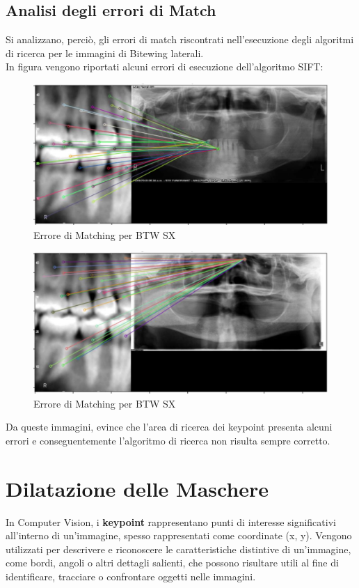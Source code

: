 \documentclass[12pt,a4paper,openright,twoside]{book}
\begin{document}
\subsection{Analisi degli errori di Match}
Si analizzano, perciò, gli errori di match riscontrati nell'esecuzione degli algoritmi di ricerca per le immagini di Bitewing laterali.\\
In figura vengono riportati alcuni errori di esecuzione dell'algoritmo SIFT:
\begin{figure}[H]
	\centering
	\includegraphics[width=13cm]{figures/matcherr.pdf}
   	\caption{Errore di Matching per BTW SX}
	\label{fig:matcherr}
\end{figure}
\begin{figure}[H]
	\centering
	\includegraphics[width=13cm]{figures/matcherr2.pdf}
    	\caption{Errore di Matching per BTW SX}
	\label{fig:matcherr2}
\end{figure}

Da queste immagini, evince che l'area di ricerca dei keypoint presenta alcuni errori e conseguentemente l'algoritmo di ricerca non risulta sempre corretto.

\section{Dilatazione delle Maschere}
In Computer Vision, i \textbf{keypoint} rappresentano punti di interesse significativi all'interno di un'immagine, spesso rappresentati come coordinate (x, y). Vengono utilizzati per descrivere e riconoscere le caratteristiche distintive di un'immagine, come bordi, angoli o altri dettagli salienti, che possono risultare utili al fine di identificare, tracciare o confrontare oggetti nelle immagini.\\
\end{document}
